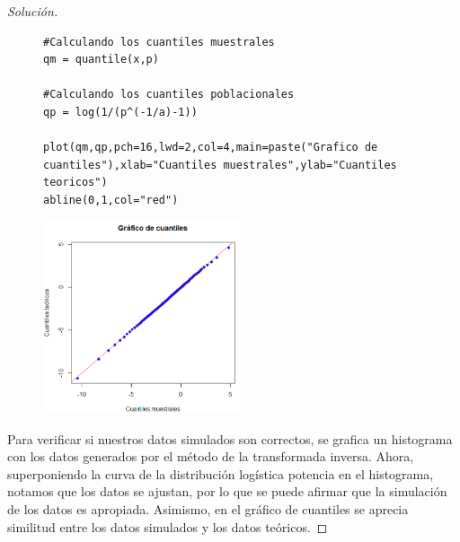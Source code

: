 \documentclass[11pt]{article}
\renewcommand{\=}[1]{\stackrel{#1}{=}} %
\newenvironment{sol}
{\begin{proof}[Solución]}
	{\end{proof}}
\theoremstyle{definition}
\theoremstyle{remark}
\begin{document}
\begin{itemize}
\begin{sol}
\begin{figure}[h]
\begin{minipage}{10cm}
{\begin{lstlisting}[style=myRstyle, caption={Verificación mediante gráfica de cuantiles / PL.}]
#Calculando los cuantiles muestrales
qm = quantile(x,p)

#Calculando los cuantiles poblacionales
qp = log(1/(p^(-1/a)-1))

plot(qm,qp,pch=16,lwd=2,col=4,main=paste("Grafico de cuantiles"),xlab="Cuantiles muestrales",ylab="Cuantiles teoricos")
abline(0,1,col="red")
			\end{lstlisting}
		}			
	\end{minipage}
	\begin{minipage}{6cm}
		\includegraphics[width=5.8cm]{qu3}
	\end{minipage}
\end{figure}

Para verificar si nuestros datos simulados son correctos, se grafica un histograma con los datos generados por el método de la transformada inversa. Ahora, superponiendo la curva de la distribución logística potencia en el histograma, notamos que los datos se ajustan, por lo que se puede afirmar que la simulación de los datos es apropiada. Asimismo, en el gráfico de cuantiles se aprecia similitud entre los datos simulados y los datos teóricos.

\end{sol}
\end{itemize}
\end{document}

